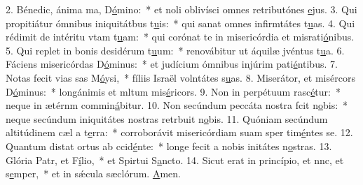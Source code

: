 2. Bénedic, ánima ma, D\uline{ó}mino:~* et noli oblivísci omnes retributónes \uline{e}jus.
3. Qui propitiátur ómnibus iniquitátbus t\uline{u}is:~* qui sanat omnes infirmtátes t\uline{u}as.
4. Qui rédimit de intéritu vtam t\uline{u}am:~* qui corónat te in misericórdia et misrati\uline{ó}nibus.
5. Qui replet in bonis desidérum t\uline{u}um:~* renovábitur ut áquilæ jvéntus t\uline{u}a.
6. Fáciens misericórdas D\uline{ó}minus:~* et judícium ómnibus injúrim pati\uline{é}ntibus.
7. Notas fecit vias sas M\uline{ó}ysi,~* fíliis Israël volntátes s\uline{u}as.
8. Miserátor, et misércors D\uline{ó}minus:~* longánimis et mltum mis\uline{é}ricors.
9. Non in perpétuum rasc\uline{é}tur:~* neque in ætérnm commin\uline{á}bitur.
10. Non secúndum peccáta nostra fcit n\uline{o}bis:~* neque secúndum iniquitátes nostras retrbuit n\uline{o}bis.
11. Quóniam secúndum altitúdinem cæl a t\uline{e}rra:~* corroborávit misericórdiam suam sper tim\uline{é}ntes se.
12. Quantum distat ortus ab ccid\uline{é}nte:~* longe fecit a nobis initátes n\uline{o}stras.
13. Glória Patr, et F\uline{í}lio,~* et Spirtui S\uline{a}ncto.
14. Sicut erat in princípio, et nnc, et s\uline{e}mper,~* et in sǽcula sæclórum. \uline{A}men.
